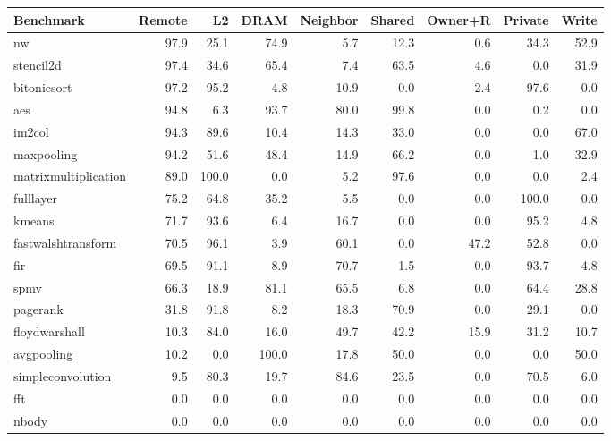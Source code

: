 \begin{tabular}{lrrrrrrrr}
\toprule
Benchmark & Remote & L2 & DRAM & Neighbor & Shared & Owner+R & Private & Write \\
\midrule
nw & 97.9 & 25.1 & 74.9 & 5.7 & 12.3 & 0.6 & 34.3 & 52.9 \\
stencil2d & 97.4 & 34.6 & 65.4 & 7.4 & 63.5 & 4.6 & 0.0 & 31.9 \\
bitonicsort & 97.2 & 95.2 & 4.8 & 10.9 & 0.0 & 2.4 & 97.6 & 0.0 \\
aes & 94.8 & 6.3 & 93.7 & 80.0 & 99.8 & 0.0 & 0.2 & 0.0 \\
im2col & 94.3 & 89.6 & 10.4 & 14.3 & 33.0 & 0.0 & 0.0 & 67.0 \\
maxpooling & 94.2 & 51.6 & 48.4 & 14.9 & 66.2 & 0.0 & 1.0 & 32.9 \\
matrixmultiplication & 89.0 & 100.0 & 0.0 & 5.2 & 97.6 & 0.0 & 0.0 & 2.4 \\
fulllayer & 75.2 & 64.8 & 35.2 & 5.5 & 0.0 & 0.0 & 100.0 & 0.0 \\
kmeans & 71.7 & 93.6 & 6.4 & 16.7 & 0.0 & 0.0 & 95.2 & 4.8 \\
fastwalshtransform & 70.5 & 96.1 & 3.9 & 60.1 & 0.0 & 47.2 & 52.8 & 0.0 \\
fir & 69.5 & 91.1 & 8.9 & 70.7 & 1.5 & 0.0 & 93.7 & 4.8 \\
spmv & 66.3 & 18.9 & 81.1 & 65.5 & 6.8 & 0.0 & 64.4 & 28.8 \\
pagerank & 31.8 & 91.8 & 8.2 & 18.3 & 70.9 & 0.0 & 29.1 & 0.0 \\
floydwarshall & 10.3 & 84.0 & 16.0 & 49.7 & 42.2 & 15.9 & 31.2 & 10.7 \\
avgpooling & 10.2 & 0.0 & 100.0 & 17.8 & 50.0 & 0.0 & 0.0 & 50.0 \\
simpleconvolution & 9.5 & 80.3 & 19.7 & 84.6 & 23.5 & 0.0 & 70.5 & 6.0 \\
fft & 0.0 & 0.0 & 0.0 & 0.0 & 0.0 & 0.0 & 0.0 & 0.0 \\
nbody & 0.0 & 0.0 & 0.0 & 0.0 & 0.0 & 0.0 & 0.0 & 0.0 \\
\bottomrule
\end{tabular}

